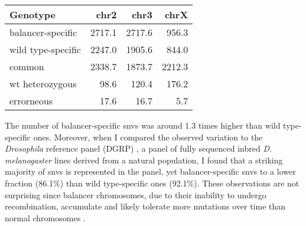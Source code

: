 \begin{table}[th]
    \centering
    \begin{tabu}{lrrr}
        \toprule
        Genotype & \ac{chr2} & \ac{chr3} & \ac{chrX} \\
        \midrule
        balancer-specific  & 2717.1 & 2717.6 &  956.3 \\
        wild type-specific & 2247.0 & 1905.6 &  844.0 \\
        common             & 2338.7 & 1873.7 & 2212.3 \\
        wt heterozygous    &   98.6 &  120.4 &  176.2 \\
        errorneous         &   17.6 &   16.7 &    5.7 \\
        \bottomrule
    \end{tabu}
\end{table}

The number of balancer-specific \acp{snv} was around 1.3 times higher than wild
type-specific ones. Moreover, when I compared the observed variation to the \textit{Drosophila}
reference panel (DGRP) \citep{Mackay2012,Huang2014}, a panel of fully sequenced
inbred \textit{D. melanogaster} lines derived from a natural population, I
found that a striking majority of \acp{snv} is represented in the panel, yet
balancer-specific \acp{snv} to a lower fraction (86.1\%) than wild type-specific
ones (92.1\%). These observations are not surprising since balancer chromosomes,
due to their inability to undergo recombination, accumulate and likely tolerate
more mutations over time than normal chromosomes \citep{Araye2013}.

